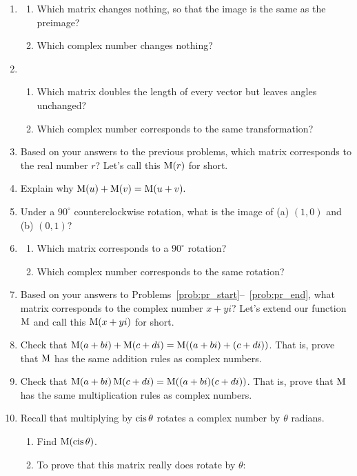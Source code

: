 \documentclass[../gatm.tex]{subfiles}
\begin{document}
\begin{enumerate}
\item \label{prob:pr_start}\begin{enumerate}
\item Which matrix changes nothing, so that the image is the same as the preimage?
\item Which complex number changes nothing?
\end{enumerate}
\item \begin{enumerate}
\item Which matrix doubles the length of every vector but leaves angles unchanged?
\item Which complex number corresponds to the same transformation?
\end{enumerate}
\item Based on your answers to the previous problems, which matrix corresponds to the real number $r$? Let's call this $\operatorname{M} (r)$ for short.
\item Explain why $\operatorname{M} (u)+\operatorname{M}(v)=\operatorname{M}(u+v).$
\item Under a $90^\circ$ counterclockwise rotation, what is the image of (a) $(1,0)$ and (b) $(0,1)$?
\item \label{prob:pr_end}\begin{enumerate}
\item Which matrix corresponds to a $90^\circ$ rotation?
\item Which complex number corresponds to the same rotation?
\end{enumerate}
\item Based on your answers to Problems~\ref{prob:pr_start}--~\ref{prob:pr_end}, what matrix corresponds to the complex number $x+yi$? Let's extend our function $\operatorname{M}$ and call this $\operatorname{M} (x+yi)$ for short.
\item Check that $\operatorname{M} (a+bi)+\operatorname{M} (c+di)=\operatorname{M}((a+bi)+(c+di))$. That is, prove that $\operatorname{M}$ has the same addition rules as complex numbers.
\item Check that $\operatorname{M} (a+bi)\operatorname{M} (c+di)=\operatorname{M}((a+bi)(c+di))$. That is, prove that $\operatorname{M}$ has the same multiplication rules as complex numbers.
\item Recall that multiplying by $\operatorname{cis}\theta$ rotates a complex number by $\theta$ radians.
\begin{enumerate}
\item Find $\operatorname{M} (\operatorname{cis}\theta)$.
\item To prove that this matrix really does rotate by $\theta$:
\begin{enumerate}

\end{enumerate}
\end{enumerate}
\end{enumerate}
\end{document}
